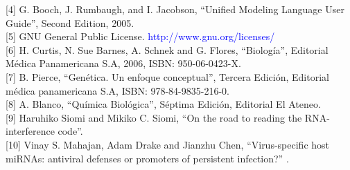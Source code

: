 \documentclass[12pt,a4paper]{article}
\begin{document}
[4] G. Booch, J. Rumbaugh, and I. Jacobson, “Unified Modeling Language User Guide”, Second Edition, 2005. \\

[5] GNU General Public License. \textcolor{blue}{http://www.gnu.org/licenses/} \\

[6] H. Curtis, N. Sue Barnes, A. Schnek and G. Flores, “Biología”, Editorial Médica Panamericana S.A, 2006, ISBN: 950-06-0423-X. \\

[7] B. Pierce, “Genética. Un enfoque conceptual”, Tercera Edición, Editorial médica panamericana S.A, ISBN: 978-84-9835-216-0. \\

[8] A. Blanco, “Química Biológica”, Séptima Edición, Editorial El Ateneo. \\

[9] Haruhiko Siomi and Mikiko C. Siomi, “On the road to reading the RNA-interference code”. \\

[10] Vinay S. Mahajan, Adam Drake and Jianzhu Chen, “Virus-specific host miRNAs: antiviral defenses or promoters of persistent infection?” .
\end{document}
